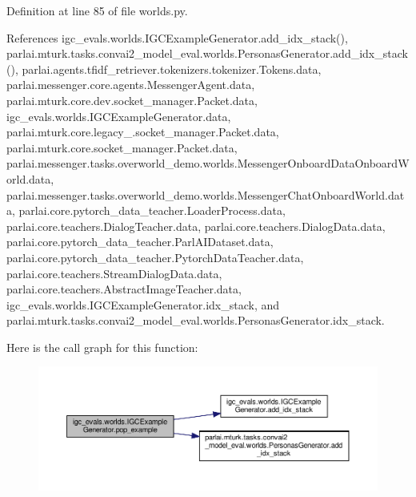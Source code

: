 Definition at line 85 of file worlds.\+py.



References igc\+\_\+evals.\+worlds.\+I\+G\+C\+Example\+Generator.\+add\+\_\+idx\+\_\+stack(), parlai.\+mturk.\+tasks.\+convai2\+\_\+model\+\_\+eval.\+worlds.\+Personas\+Generator.\+add\+\_\+idx\+\_\+stack(), parlai.\+agents.\+tfidf\+\_\+retriever.\+tokenizers.\+tokenizer.\+Tokens.\+data, parlai.\+messenger.\+core.\+agents.\+Messenger\+Agent.\+data, parlai.\+mturk.\+core.\+dev.\+socket\+\_\+manager.\+Packet.\+data, igc\+\_\+evals.\+worlds.\+I\+G\+C\+Example\+Generator.\+data, parlai.\+mturk.\+core.\+legacy\+\_.\+socket\+\_\+manager.\+Packet.\+data, parlai.\+mturk.\+core.\+socket\+\_\+manager.\+Packet.\+data, parlai.\+messenger.\+tasks.\+overworld\+\_\+demo.\+worlds.\+Messenger\+Onboard\+Data\+Onboard\+World.\+data, parlai.\+messenger.\+tasks.\+overworld\+\_\+demo.\+worlds.\+Messenger\+Chat\+Onboard\+World.\+data, parlai.\+core.\+pytorch\+\_\+data\+\_\+teacher.\+Loader\+Process.\+data, parlai.\+core.\+teachers.\+Dialog\+Teacher.\+data, parlai.\+core.\+teachers.\+Dialog\+Data.\+data, parlai.\+core.\+pytorch\+\_\+data\+\_\+teacher.\+Parl\+A\+I\+Dataset.\+data, parlai.\+core.\+pytorch\+\_\+data\+\_\+teacher.\+Pytorch\+Data\+Teacher.\+data, parlai.\+core.\+teachers.\+Stream\+Dialog\+Data.\+data, parlai.\+core.\+teachers.\+Abstract\+Image\+Teacher.\+data, igc\+\_\+evals.\+worlds.\+I\+G\+C\+Example\+Generator.\+idx\+\_\+stack, and parlai.\+mturk.\+tasks.\+convai2\+\_\+model\+\_\+eval.\+worlds.\+Personas\+Generator.\+idx\+\_\+stack.

Here is the call graph for this function\+:
\nopagebreak
\begin{figure}[H]
\begin{center}
\leavevmode
\includegraphics[width=350pt]{classigc__evals_1_1worlds_1_1IGCExampleGenerator_a68420b6b80ae5d3a8825302359371ed5_cgraph}
\end{center}
\end{figure}
\mbox{\label{classigc__evals_1_1worlds_1_1IGCExampleGenerator_a34dc6ef46a9ba8a1c72c8b674ff444b9}} 
